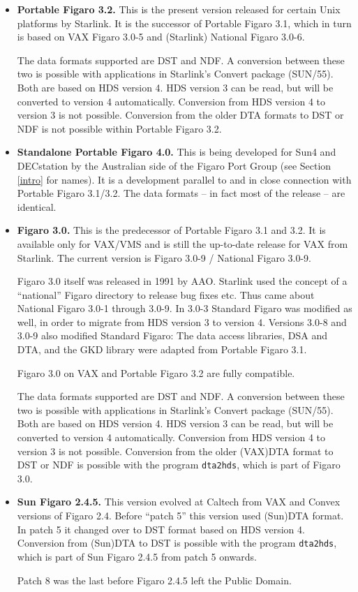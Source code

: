 \begin{itemize}
\item {\bf Portable Figaro 3.2.}  This is the present version released
   for certain Unix platforms by Starlink.  It is the successor of
   Portable Figaro 3.1, which in turn is based on VAX Figaro 3.0-5 and
   (Starlink) National Figaro 3.0-6.

   The data formats supported are DST and NDF.  A conversion between
   these two is possible with applications in Starlink's Convert package
   (SUN/55).  Both are based on HDS version 4.  HDS version 3 can be
   read, but will be converted to version 4 automatically.  Conversion
   from HDS version 4 to version 3 is not possible.  Conversion from the
   older DTA formats to DST or NDF is not possible within Portable
   Figaro 3.2.

\item {\bf Standalone Portable Figaro 4.0.} This is being developed for
   Sun4 and DECstation by the Australian side of the Figaro Port Group
   (see Section \ref{intro} for names).  It is a development parallel to
   and in close connection with Portable Figaro 3.1/3.2.  The data
   formats -- in fact most of the release -- are identical.

\item {\bf Figaro 3.0.}  This is the predecessor of Portable Figaro 3.1
   and 3.2.  It is available only for VAX/VMS and is still the
   up-to-date release for VAX from Starlink.  The current version is
   Figaro 3.0-9 / National Figaro 3.0-9.

   Figaro 3.0 itself was released in 1991 by AAO.  Starlink used the
   concept of a ``national'' Figaro directory to release bug fixes etc.
   Thus came about National Figaro 3.0-1 through 3.0-9.  In 3.0-3
   Standard Figaro was modified as well, in order to migrate from HDS
   version 3 to version 4.  Versions 3.0-8 and 3.0-9 also modified Standard
   Figaro: The data access libraries, DSA and DTA, and the GKD library
   were adapted from Portable Figaro 3.1.

   Figaro 3.0 on VAX and Portable Figaro 3.2 are fully compatible.

   The data formats supported are DST and NDF.  A conversion between
   these two is possible with applications in Starlink's Convert package
   (SUN/55).  Both are based on HDS version 4.  HDS version 3 can be
   read, but will be converted to version 4 automatically.  Conversion
   from HDS version 4 to version 3 is not possible.  Conversion from the
   older (VAX)DTA format to DST or NDF is possible with the program
   {\tt dta2hds}, which is part of Figaro 3.0.

\item{\bf Sun Figaro 2.4.5.}  This version evolved at Caltech from VAX
   and Convex versions of Figaro 2.4.  Before ``patch 5'' this version
   used (Sun)DTA format.  In patch 5 it changed over to DST format based
   on HDS version 4.  Conversion from (Sun)DTA to DST is possible with
   the program {\tt dta2hds}, which is part of Sun Figaro 2.4.5 from
   patch 5 onwards.

   Patch 8 was the last before Figaro 2.4.5 left the Public Domain.
\end{itemize}

